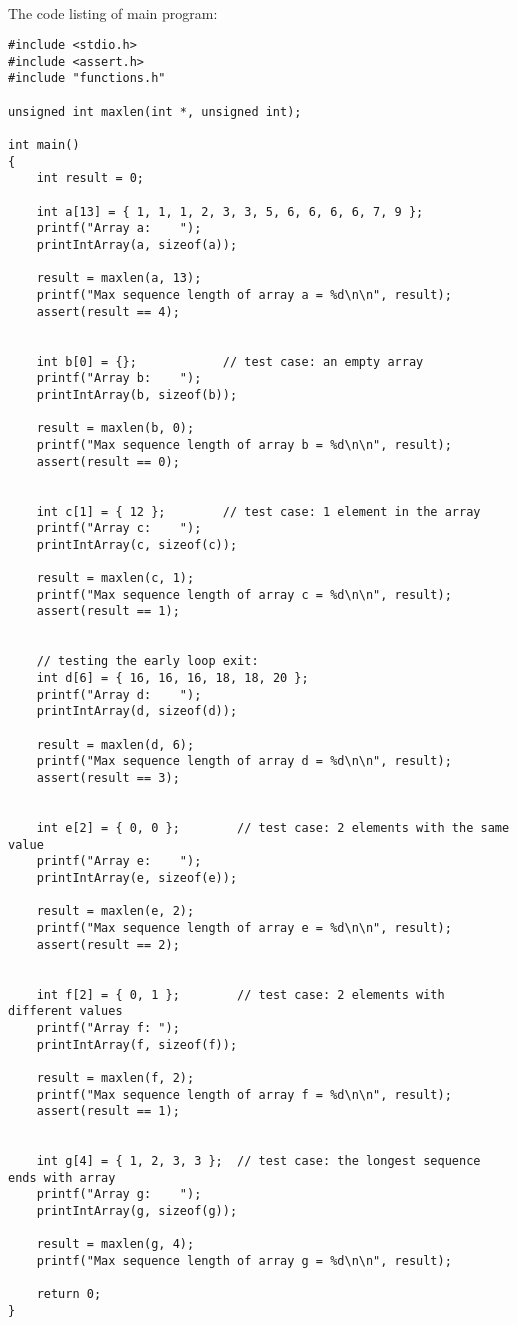 \documentclass{article}
\begin{document}
\paragraph{}\
\paragraph{}\
\paragraph{}\

		\rmfamily
		\noindent The code listing of main program:
		\begin{verbatim}
#include <stdio.h>
#include <assert.h>
#include "functions.h"

unsigned int maxlen(int *, unsigned int);

int main()
{
    int result = 0;

    int a[13] = { 1, 1, 1, 2, 3, 3, 5, 6, 6, 6, 6, 7, 9 };
    printf("Array a:    ");
    printIntArray(a, sizeof(a));

    result = maxlen(a, 13);
    printf("Max sequence length of array a = %d\n\n", result);
    assert(result == 4);


    int b[0] = {};            // test case: an empty array
    printf("Array b:    ");
    printIntArray(b, sizeof(b));

    result = maxlen(b, 0);
    printf("Max sequence length of array b = %d\n\n", result);
    assert(result == 0);


    int c[1] = { 12 };        // test case: 1 element in the array
    printf("Array c:    ");
    printIntArray(c, sizeof(c));

    result = maxlen(c, 1);
    printf("Max sequence length of array c = %d\n\n", result);
    assert(result == 1);


    // testing the early loop exit:
    int d[6] = { 16, 16, 16, 18, 18, 20 };
    printf("Array d:    ");
    printIntArray(d, sizeof(d));

    result = maxlen(d, 6);
    printf("Max sequence length of array d = %d\n\n", result);
    assert(result == 3);


    int e[2] = { 0, 0 };        // test case: 2 elements with the same value
    printf("Array e:    ");
    printIntArray(e, sizeof(e));

    result = maxlen(e, 2);
    printf("Max sequence length of array e = %d\n\n", result);
    assert(result == 2);


    int f[2] = { 0, 1 };        // test case: 2 elements with different values
    printf("Array f: ");
    printIntArray(f, sizeof(f));

    result = maxlen(f, 2);
    printf("Max sequence length of array f = %d\n\n", result);
    assert(result == 1);


    int g[4] = { 1, 2, 3, 3 };  // test case: the longest sequence ends with array
    printf("Array g:    ");
    printIntArray(g, sizeof(g));

    result = maxlen(g, 4);
    printf("Max sequence length of array g = %d\n\n", result);

    return 0;
}
		\end{verbatim}
\end{document}
